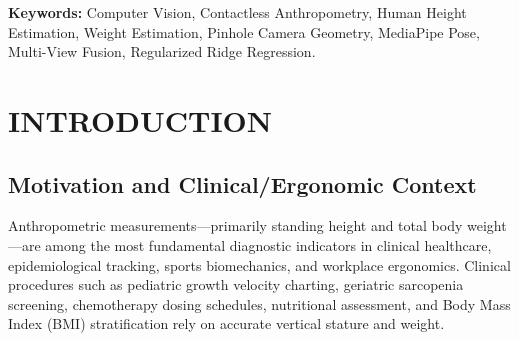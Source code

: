 \documentclass[12pt,a4paper,oneside]{report}
\begin{document}
\vspace{0.6cm}
\noindent\textbf{Keywords:} Computer Vision, Contactless Anthropometry, Human Height Estimation, Weight Estimation, Pinhole Camera Geometry, MediaPipe Pose, Multi-View Fusion, Regularized Ridge Regression.

\clearpage
\tableofcontents

\clearpage
\listoftables

\clearpage
\listoffigures

\clearpage
{}
\setcounter{page}{1}

\chapter{INTRODUCTION}

\section{Motivation and Clinical/Ergonomic Context}
Anthropometric measurements---primarily standing height and total body weight---are among the most fundamental diagnostic indicators in clinical healthcare, epidemiological tracking, sports biomechanics, and workplace ergonomics. Clinical procedures such as pediatric growth velocity charting, geriatric sarcopenia screening, chemotherapy dosing schedules, nutritional assessment, and Body Mass Index (BMI) stratification rely on accurate vertical stature and weight.
\end{document}
